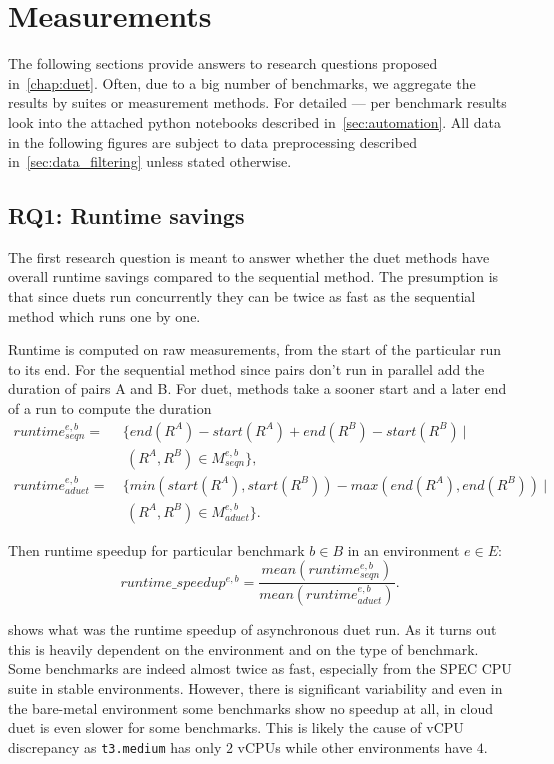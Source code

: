 \section{Measurements}
\label{sec:measurements}

The following sections provide answers to research questions proposed in~\cref{chap:duet}.
Often, due to a big number of benchmarks, we aggregate the results by suites or measurement methods.
For detailed --- per benchmark results look into the attached python notebooks described in~\cref{sec:automation}.
All data in the following figures are subject to data preprocessing described in~\cref{sec:data_filtering} unless stated otherwise.

\subsection{RQ1: Runtime savings}
\label{sec:rq1}

The first research question is meant to answer whether the duet methods have overall runtime savings compared to the sequential method.
The presumption is that since duets run concurrently they can be twice as fast as the sequential method which runs one by one.

Runtime is computed on raw measurements, from the start of the particular run to its end. For the sequential method since pairs don't run in parallel add the duration of pairs A and B.
For duet, methods take a sooner start and a later end of a run to compute the duration
\begin{align*}
runtime^{e, b}_{seqn}  =&~\{end(R^A) - start(R^A) + end(R^B) - start(R^B)~|\\
                        &~~(R^A, R^B) \in M^{e, b}_{seqn}\}, \\
runtime^{e, b}_{aduet} =&~\{min(start(R^A), start(R^B)) - max(end(R^A), end(R^B))~|\\
                        &~~(R^A, R^B) \in M^{e, b}_{aduet}\}.
\end{align*}

Then runtime speedup for particular benchmark $b \in B$ in an environment $e \in E$:
\begin{equation}\label{eq:runtimespeedup}
runtime\_speedup^{e, b} = \frac{mean(runtime^{e, b}_{seqn})}{mean(runtime^{e, b}_{aduet})}.
\end{equation}

 shows what was the runtime speedup of asynchronous duet run.
As it turns out this is heavily dependent on the environment and on the type of benchmark.
Some benchmarks are indeed almost twice as fast, especially from the SPEC CPU suite in stable environments.
However, there is significant variability and even in the \mbox{bare-metal} environment some benchmarks show no speedup at all, in cloud duet is even slower for some benchmarks.
This is likely the cause of vCPU discrepancy as \lstinline{t3.medium} has only $2$ vCPUs while other environments have $4$.

